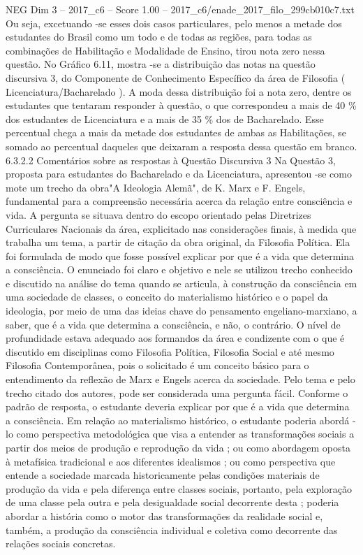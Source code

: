 \begin{textsample}{NEG Dim 3 – 2017\_c6 – Score 1.00 – 2017\_c6/enade\_2017\_filo\_299cb010c7.txt}
Ou seja, excetuando -se esses dois casos particulares, pelo menos a metade dos estudantes do Brasil como um todo e de todas as regiões, para todas as combinações de Habilitação e Modalidade de Ensino, tirou nota zero nessa questão.
No Gráfico 6.11, mostra -se a distribuição das notas na questão discursiva 3, do Componente de Conhecimento Específico da área de Filosofia ( Licenciatura/Bacharelado ).
A moda dessa distribuição foi a nota zero, dentre os estudantes que tentaram responder à questão, o que correspondeu a mais de 40 \% dos estudantes de Licenciatura e a mais de 35 \% dos de Bacharelado.
Esse percentual chega a mais da metade dos estudantes de ambas as Habilitações, se somado ao percentual daqueles que deixaram a resposta dessa questão em branco. 6.3.2.2 Comentários sobre as respostas à Questão Discursiva 3 Na Questão 3, proposta para estudantes do Bacharelado e da Licenciatura, apresentou -se como mote um trecho da obra"A Ideologia Alemã", de K.
Marx e F.
Engels, fundamental para a compreensão necessária acerca da relação entre consciência e vida.
A pergunta se situava dentro do escopo orientado pelas Diretrizes Curriculares Nacionais da área, explicitado nas considerações finais, à medida que trabalha um tema, a partir de citação da obra original, da Filosofia Política.
Ela foi formulada de modo que fosse possível explicar por que é a vida que determina a consciência.
O enunciado foi claro e objetivo e nele se utilizou trecho conhecido e discutido na análise do tema quando se articula, à construção da consciência em uma sociedade de classes, o conceito do materialismo histórico e o papel da ideologia, por meio de uma das ideias chave do pensamento engeliano-marxiano, a saber, que é a vida que determina a consciência, e não, o contrário.
O nível de profundidade estava adequado aos formandos da área e condizente com o que é discutido em disciplinas como Filosofia Política, Filosofia Social e até mesmo Filosofia Contemporânea, pois o solicitado é um conceito básico para o entendimento da reflexão de Marx e Engels acerca da sociedade.
Pelo tema e pelo trecho citado dos autores, pode ser considerada uma pergunta fácil.
Conforme o padrão de resposta, o estudante deveria explicar por que é a vida que determina a consciência.
Em relação ao materialismo histórico, o estudante poderia abordá -lo como perspectiva metodológica que visa a entender as transformações sociais a partir dos meios de produção e reprodução da vida ; ou como abordagem oposta à metafísica tradicional e aos diferentes idealismos ; ou como perspectiva que entende a sociedade marcada historicamente pelas condições materiais de produção da vida e pela diferença entre classes sociais, portanto, pela exploração de uma classe pela outra e pela desigualdade social decorrente desta ; poderia abordar a história como o motor das transformações da realidade social e, também, a produção da consciência individual e coletiva como decorrente das relações sociais concretas.

\end{textsample}
